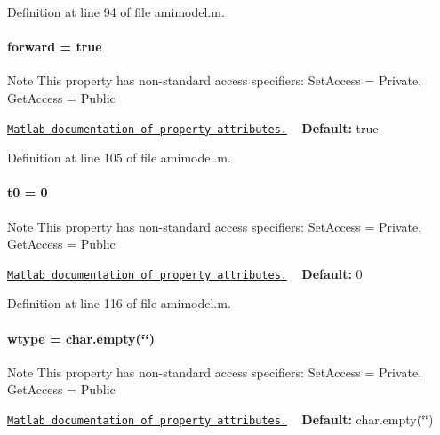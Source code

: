 Definition at line 94 of file amimodel.\+m.

\hypertarget{classamimodel_a81e42e48c9c72814166c8f7cd414ce24}{}
\paragraph[{forward}]{\setlength{\rightskip}{0pt plus 5cm}forward = true}\label{classamimodel_a81e42e48c9c72814166c8f7cd414ce24}
\begin{DoxyNote}{Note}
This property has non-\/standard access specifiers\+: {\ttfamily Set\+Access = Private, Get\+Access = Public} 

\href{http://www.mathworks.com/help/matlab/matlab_oop/property-attributes.html}{\tt Matlab documentation of property attributes.} ~\newline
{\bfseries Default\+:} true 
\end{DoxyNote}


Definition at line 105 of file amimodel.\+m.

\hypertarget{classamimodel_abdb5a42ffee3ca622484b53a322f1004}{}
\paragraph[{t0}]{\setlength{\rightskip}{0pt plus 5cm}t0 = 0}\label{classamimodel_abdb5a42ffee3ca622484b53a322f1004}
\begin{DoxyNote}{Note}
This property has non-\/standard access specifiers\+: {\ttfamily Set\+Access = Private, Get\+Access = Public} 

\href{http://www.mathworks.com/help/matlab/matlab_oop/property-attributes.html}{\tt Matlab documentation of property attributes.} ~\newline
{\bfseries Default\+:} 0 
\end{DoxyNote}


Definition at line 116 of file amimodel.\+m.

\hypertarget{classamimodel_a5376250224ce32fb558d88aa0b5a93ff}{}
\paragraph[{wtype}]{\setlength{\rightskip}{0pt plus 5cm}wtype = char.\+empty(\char`\"{}\char`\"{})}\label{classamimodel_a5376250224ce32fb558d88aa0b5a93ff}
\begin{DoxyNote}{Note}
This property has non-\/standard access specifiers\+: {\ttfamily Set\+Access = Private, Get\+Access = Public} 

\href{http://www.mathworks.com/help/matlab/matlab_oop/property-attributes.html}{\tt Matlab documentation of property attributes.} ~\newline
{\bfseries Default\+:} char.\+empty(\char`\"{}\char`\"{}) 
\end{DoxyNote}


